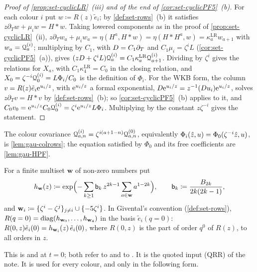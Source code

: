 \begin{proof}[Proof of \cref{prop:set-cyclicLR}~(iii) and of the end of \cref{cor:set-cyclicPF5}~(b)]
For each colour $i$ put $w\coloneqq R(z)\tilde e_i$; by \cref{def:set-rows}~(b) it satisfies $z\partial_Tw+\mu_iw=H*w$. Taking lowered components as in the proof of \cref{prop:set-cyclicLR}~(ii), $z\partial_Tw_a+\mu_iw_a=\eta(H^a,H*w)=\eta(H*H^a,w)=\kappa^{\mathrm{LR}}_aw_{a+1}$ with $w_a=\mathcal{Q}^{(i)}_a$; multiplying by $C_1$, with $D=C_1\partial_T$ and $C_1\mu_i=\zeta^iL$ (\cref{cor:set-cyclicPF5}~(a)), gives $(zD+\zeta^iL)\mathcal{Q}^{(i)}_a=C_1\kappa^{\mathrm{LR}}_a\mathcal{Q}^{(i)}_{a+1}$. Dividing by $\zeta^i$ gives the relations for $X_a$, with $C_1\kappa^{\mathrm{LR}}_4=C_0$ in the closing relation, and $X_0=\zeta^{-i}\mathcal{Q}^{(i)}_0=L\Phi_i/C_0$ is the definition of $\Phi_i$. For the WKB form, the column $v=R(z)\tilde e_i\mathrm{e}^{u_i/z}$, with $\mathrm{e}^{u_i/z}$ a formal exponential, $D\mathrm{e}^{u_i/z}=z^{-1}(D u_i)\mathrm{e}^{u_i/z}$, solves $z\partial_Tv=H*v$ by \cref{def:set-rows}~(b); so \cref{cor:set-cyclicPF5}~(b) applies to it, and $C_0v_0=\mathrm{e}^{u_i/z}C_0\mathcal{Q}^{(i)}_0=\zeta^i\mathrm{e}^{u_i/z}L\Phi_i$. Multiplying by the constant $z\zeta^{-i}$ gives the statement.
\end{proof}

The colour covariance $\mathcal{Q}^{(i)}_{a,n}=\zeta^{i(a+1-n)}\mathcal{Q}^{(0)}_{a,n}$, equivalently $\Phi_i(\hat{z},u)=\Phi_0(\zeta^{-i}\hat{z},u)$, is \cref{lem:gau-colrows}; the equation satisfied by $\Phi_0$ and its free coefficients are \cref{lem:gau-HPF}.

\begin{thm}[The $R$-matrix at $q=0$, (QRR); quoted]
\label{thm:set-qrr}
For a finite multiset $\mathbf w$ of non-zero numbers put
\begin{equation}
\label{eq:set-hw}
h_{\mathbf{w}}(z)\coloneqq\exp\Bigl(-\sum_{k\geq1}\mathsf{b}_k\,z^{2k-1}\sum_{a\in\mathbf w}a^{1-2k}\Bigr),\qquad\mathsf{b}_k\coloneqq\frac{B_{2k}}{2k(2k-1)},
\end{equation}
and $\mathbf{w}_i\coloneqq\{\zeta^i-\zeta^j\}_{j\neq i}\cup\{-5\zeta^i\}$. In Givental's convention (\cref{def:set-rows}), $R(q=0)=\operatorname{diag}(h_{\mathbf{w}_0},\dots,h_{\mathbf{w}_4})$ in the basis $\tilde e_i(q=0)$: $R(0,z)\tilde e_i(0)=h_{\mathbf{w}_i}(z)\,\tilde e_i(0)$, where $R(0,z)$ is the part of order $q^0$ of $R(z)$, to all orders in $z$.
\end{thm}

This is \cite[proof of Lemma~5.2, (17)]{GJR18} and \cite[proof of Lemma~4.6, (19)--(20)]{GJR17} at $t=0$; both refer to \cite[Section~2.2, Theorem~1 and the Remark after it]{Giv01} and to \cite[Theorem~1, Corollary~1]{MR2276766}. It is the quoted input (QRR) of the note. It is used for every colour, and only in the following form.

